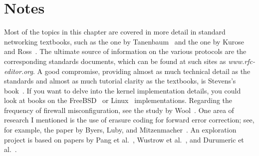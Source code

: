 \section*{Notes}
Most of the topics in this chapter are covered in more detail in
standard networking textbooks, such as the one by
Tanenbaum~\cite{max1150} and the one by Kurose and
Ross~\cite{max1151}.  The ultimate source of information on the
various protocols are the corresponding standards documents, which can
be found at such sites as \textit{www.rfc-editor.org}.  A good compromise,
providing almost as much technical detail as the standards and almost
as much tutorial clarity as the textbooks, is Stevens's
book~\cite{max1152}.  If you want to delve into the kernel
implementation details, you could look at books on the
FreeBSD~\cite{max1153} or Linux~\cite{max1154} implementations.
Regarding the frequency of firewall misconfiguration, see the study by Wool~\cite{max1146}.
One area of research I mentioned is the use of erasure coding for
forward error correction; see, for example, the paper by Byers, Luby,
and Mitzenmacher~\cite{max1155}.  An exploration project is based on papers  by Pang et al.~\cite{max1156},
Wustrow et al.~\cite{Wustrow:2010:IBR:1879141.1879149}, and Durumeric et al.~\cite{184493}.

